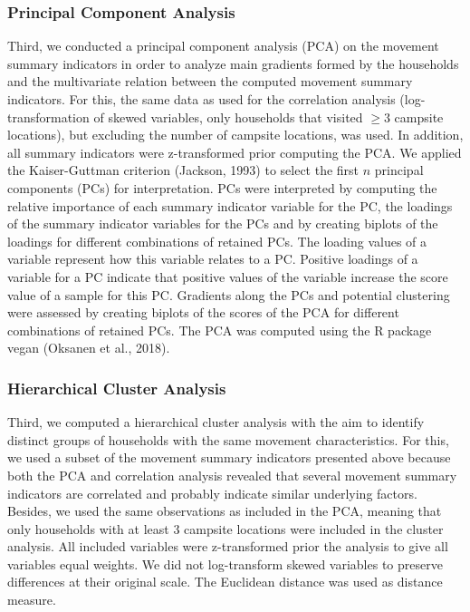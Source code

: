 \documentclass[]{elsarticle} %
\begin{document}
\hypertarget{principal-component-analysis}{%
\subsubsection{Principal Component
Analysis}\label{principal-component-analysis}}

Third, we conducted a principal component analysis (PCA) on the movement
summary indicators in order to analyze main gradients formed by the
households and the multivariate relation between the computed movement
summary indicators. For this, the same data as used for the correlation
analysis (log-transformation of skewed variables, only households that
visited \(\ge 3\) campsite locations), but excluding the number of
campsite locations, was used. In addition, all summary indicators were
z-transformed prior computing the PCA. We applied the Kaiser-Guttman
criterion (Jackson, 1993) to select the first \(n\) principal components
(PCs) for interpretation. PCs were interpreted by computing the relative
importance of each summary indicator variable for the PC, the loadings
of the summary indicator variables for the PCs and by creating biplots
of the loadings for different combinations of retained PCs. The loading
values of a variable represent how this variable relates to a PC.
Positive loadings of a variable for a PC indicate that positive values
of the variable increase the score value of a sample for this PC.
Gradients along the PCs and potential clustering were assessed by
creating biplots of the scores of the PCA for different combinations of
retained PCs. The PCA was computed using the R package vegan (Oksanen et
al., 2018).

\hypertarget{hierarchical-cluster-analysis}{%
\subsubsection{Hierarchical Cluster
Analysis}\label{hierarchical-cluster-analysis}}

Third, we computed a hierarchical cluster analysis with the aim to
identify distinct groups of households with the same movement
characteristics. For this, we used a subset of the movement summary
indicators presented above because both the PCA and correlation analysis
revealed that several movement summary indicators are correlated and
probably indicate similar underlying factors. Besides, we used the same
observations as included in the PCA, meaning that only households with
at least 3 campsite locations were included in the cluster analysis. All
included variables were z-transformed prior the analysis to give all
variables equal weights. We did not log-transform skewed variables to
preserve differences at their original scale. The Euclidean distance was
used as distance measure.
\end{document}
